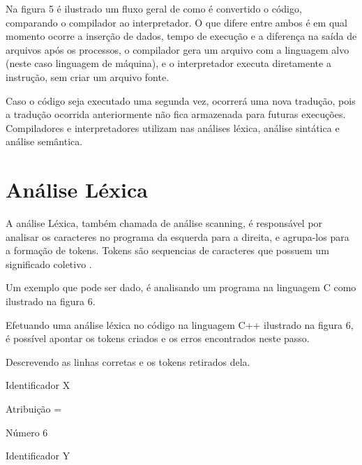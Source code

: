 \documentclass[12pt,oneside,a4paper,chapter=TITLE,section=TITLE,sumario=tradicional]{abntex2}
\begin{document}
Na figura 5 é ilustrado um fluxo geral de como é convertido o código, comparando o compilador ao interpretador. O que difere entre ambos é em qual momento ocorre a inserção de dados, tempo de execução e a diferença na saída de arquivos após os processos, o compilador gera um arquivo com a linguagem alvo (neste caso linguagem de máquina), e o interpretador executa diretamente a instrução, sem criar um arquivo fonte.

\begin{figure}[htb]
\end{figure}

Caso o código seja executado uma segunda vez, ocorrerá uma nova tradução, pois a tradução ocorrida anteriormente não fica armazenada para futuras execuções. Compiladores e interpretadores utilizam nas análises léxica, análise sintática e análise semântica.

\section{Análise Léxica}
\label{sec:analise-lexica}

A análise Léxica, também chamada de análise scanning, é responsável por analisar os caracteres no programa da esquerda para a direita, e agrupa-los para a formação de tokens. Tokens são sequencias de caracteres que possuem um significado coletivo \cite{alfred1995}.

Um exemplo que pode ser dado, é analisando um programa na linguagem C como ilustrado na figura 6.

\begin{figure}[htb]
\end{figure}

Efetuando uma análise léxica no código na linguagem C++ ilustrado na figura 6, é possível apontar os tokens criados e os erros encontrados neste passo. 

Descrevendo as linhas corretas e os tokens retirados dela.

\begin{lista}
	\item Identificador    X 
	\item Atribuição        = 
	\item Número            6 
	\item Identificador    Y
\end{lista}
\end{document}
